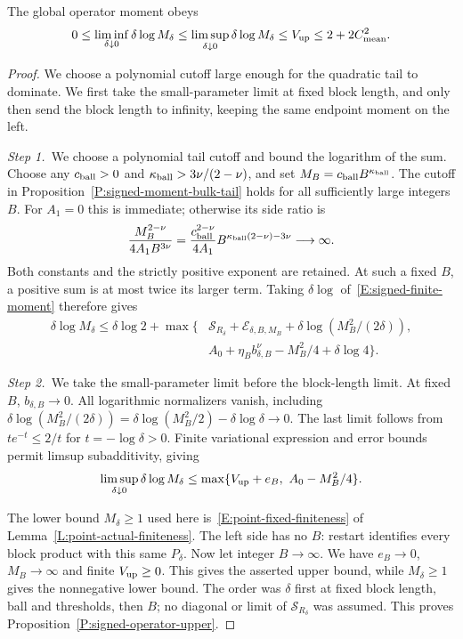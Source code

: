 \begin{proposition}
  \label{P:signed-operator-upper}
  The global operator moment obeys
  \[
    0\le\liminf_{\delta\downarrow0}\delta\log M_\delta
    \le\limsup_{\delta\downarrow0}\delta\log M_\delta
    \le V_{\rm up}\le2+2C_{\rm mean}^2 .
  \]
\end{proposition}

\begin{proof}
  We choose a polynomial cutoff large enough for the quadratic tail to
  dominate. We first take the small-parameter limit at fixed block length, and
  only then send the block length to infinity, keeping the same endpoint
  moment on the left.


  \medskip
  \noindent\textit{Step 1.~}We choose a polynomial tail cutoff and bound the
  logarithm of the sum.
  Choose any $c_{\rm ball} > 0$ and $\kappa_{\rm ball} > 3\nu/(2-\nu)$, and set
  $M_B = c_{\rm ball}B^{\kappa_{\rm ball}}$. The cutoff in
  Proposition~\ref{P:signed-moment-bulk-tail} holds for all sufficiently large
  integers $B$. For $A_1 = 0$ this is immediate; otherwise its side ratio is
  \[
    \frac{M_B^{2-\nu}}{4A_1B^{3\nu}}
    =\frac{c_{\rm ball}^{2-\nu}}{4A_1}
    B^{\kappa_{\rm ball}(2-\nu)-3\nu}\longrightarrow\infty .
  \]
  Both constants and the strictly positive exponent are retained. At such a
  fixed $B$, a positive sum is at most twice its larger term. Taking
  $\delta\log$ of~\eqref{E:signed-finite-moment} therefore gives
  \begin{align*}
    \delta\log M_\delta\le\delta\log2+
    \max\{&
    \mathcal{S}_{R_\delta}+\mathcal{E}_{\delta,B,M_B}
    +\delta\log(M_B^2/(2\delta)),\\
    &A_0+\eta_Bb_{\delta,B}^\nu-M_B^2/4+\delta\log4\}.
  \end{align*}

  \medskip
  \noindent\textit{Step 2.~}We take the small-parameter limit before the
  block-length limit.
  At fixed $B$, $b_{\delta,B} \to 0$. All logarithmic normalizers vanish,
  including $\delta\log(M_B^2/(2\delta)) = \delta\log(M_B^2/2)-\delta\log\delta
  \to 0$. The last limit follows from $te^{-t} \le 2/t$ for $t = -\log\delta >
  0$. Finite variational expression and error bounds permit limsup
  subadditivity, giving
  \[
    \limsup_{\delta\downarrow0}\delta\log M_\delta
    \le\max\{V_{\rm up}+e_B,\ A_0-M_B^2/4\}.
  \]

  The lower bound $M_\delta\ge1$ used here is~\eqref{E:point-fixed-finiteness}
  of Lemma~\ref{L:point-actual-finiteness}.
  The left side has no $B$: restart identifies every block product with this
  same $P_\delta$. Now let integer $B \to \infty$. We have $e_B \to 0$, $M_B \to
  \infty$ and finite $V_{\rm up} \ge 0$. This gives the asserted upper bound,
  while $M_\delta \ge 1$ gives the nonnegative lower bound. The order was
  $\delta$ first at fixed block length, ball and thresholds, then $B$; no
  diagonal or limit of $\mathcal{S}_{R_\delta}$ was assumed. This proves
  Proposition~\ref{P:signed-operator-upper}.
\end{proof}

